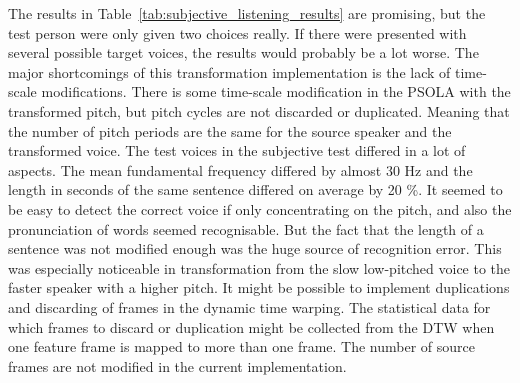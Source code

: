 The results in Table~\ref{tab:subjective_listening_results} are promising, but the test person were only given two choices really. If there were presented with several possible target voices, the results would probably be a lot worse. The major shortcomings of this transformation implementation is the lack of time-scale modifications. There is some time-scale modification in the PSOLA with the transformed pitch, but pitch cycles are not discarded or duplicated. Meaning that the number of pitch periods are the same for the source speaker and the transformed voice. The test voices in the subjective test differed in a lot of aspects. The mean fundamental frequency differed by almost 30 Hz and the length in seconds of the same sentence differed on average by 20 \%. It seemed to be easy to detect the correct voice if only concentrating on the pitch, and also the pronunciation of words seemed recognisable. But the fact that the length of a sentence was not modified enough was the huge source of recognition error. This was especially noticeable in transformation from the slow low-pitched voice to the faster speaker with a higher pitch. It might be possible to implement duplications and discarding of frames in the dynamic time warping. The statistical data for which frames to discard or duplication might be collected from the DTW when one feature frame is mapped to more than one frame. The number of source frames are not modified in the current implementation.


